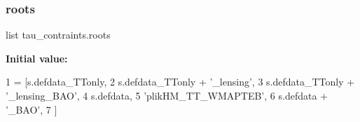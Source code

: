 \subsubsection{\texorpdfstring{roots}{roots}}
{\footnotesize\ttfamily list tau\+\_\+contraints.\+roots}

{\bfseries Initial value\+:}
\begin{DoxyCode}
1 =  [s.defdata\_TTonly,
2          s.defdata\_TTonly + \textcolor{stringliteral}{'\_lensing'},
3          s.defdata\_TTonly + \textcolor{stringliteral}{'\_lensing\_BAO'},
4          s.defdata,
5          \textcolor{stringliteral}{'plikHM\_TT\_WMAPTEB'},
6          s.defdata + \textcolor{stringliteral}{'\_BAO'},
7          ]
\end{DoxyCode}
